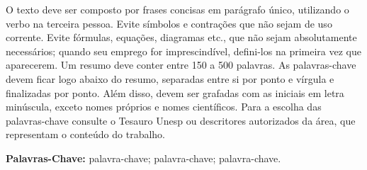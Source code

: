 \documentclass[
  12pt,		%
  a4paper,	%
  openright,  %
  oneside,	%
  chapter=TITLE,		%
  section=TITLE,		%
  english,	%
  french,	    %
  spanish,	%
  brazil	    %
]{abntex2}
\begin{document}
    
    \begin{resumo}
    
    O texto deve ser composto por frases concisas em parágrafo único, utilizando o verbo na terceira pessoa. Evite símbolos e contrações que não sejam de uso corrente. Evite fórmulas, equações, diagramas etc., que não sejam absolutamente necessários; quando seu emprego for imprescindível, defini-los na primeira vez que aparecerem. Um resumo deve conter entre 150 a 500 palavras. As palavras-chave devem ficar logo abaixo do resumo, separadas entre si por ponto e vírgula e finalizadas por ponto. Além disso, devem ser grafadas com as iniciais em letra minúscula, exceto nomes próprios e nomes científicos. Para a escolha das palavras-chave consulte o Tesauro Unesp ou descritores autorizados da área, que representam o conteúdo do trabalho.
        
        \vspace*{0.5cm}
    
        \noindent\textbf{{Palavras-Chave: }} palavra-chave; palavra-chave; palavra-chave.
    
    \end{resumo}
    

    
\end{document}
